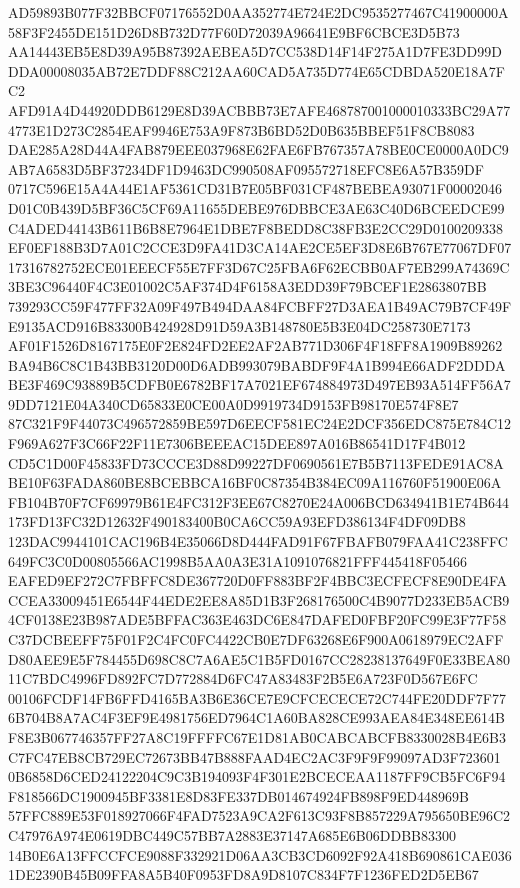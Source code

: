 \documentclass[UTF8,fontset=fandol,zihao=-4,a4paper]{ctexart}
\begin{document}
{{AD59893B077F32BBCF07176552D0AA352774E724E2DC9535277467C41900000A58F3F2455DE151D26D8B732D77F60D72039A96641E9BF6CBCE3D5B73
AA14443EB5E8D39A95B87392AEBEA5D7CC538D14F14F275A1D7FE3DD99DDDA00008035AB72E7DDF88C212AA60CAD5A735D774E65CDBDA520E18A7FC2
AFD91A4D44920DDB6129E8D39ACBBB73E7AFE468787001000010333BC29A774773E1D273C2854EAF9946E753A9F873B6BD52D0B635BBEF51F8CB8083
DAE285A28D44A4FAB879EEE037968E62FAE6FB767357A78BE0CE0000A0DC9AB7A6583D5BF37234DF1D9463DC990508AF095572718EFC8E6A57B359DF
0717C596E15A4A44E1AF5361CD31B7E05BF031CF487BEBEA93071F00002046D01C0B439D5BF36C5CF69A11655DEBE976DBBCE3AE63C40D6BCEEDCE99
C4ADED44143B611B6B8E7964E1DBE7F8BEDD8C38FB3E2CC29D0100209338EF0EF188B3D7A01C2CCE3D9FA41D3CA14AE2CE5EF3D8E6B767E77067DF07
17316782752ECE01EEECF55E7FF3D67C25FBA6F62ECBB0AF7EB299A74369C3BE3C96440F4C3E01002C5AF374D4F6158A3EDD39F79BCEF1E2863807BB
739293CC59F477FF32A09F497B494DAA84FCBFF27D3AEA1B49AC79B7CF49FE9135ACD916B83300B424928D91D59A3B148780E5B3E04DC258730E7173
AF01F1526D8167175E0F2E824FD2EE2AF2AB771D306F4F18FF8A1909B89262BA94B6C8C1B43BB3120D00D6ADB993079BABDF9F4A1B994E66ADF2DDDA
BE3F469C93889B5CDFB0E6782BF17A7021EF674884973D497EB93A514FF56A79DD7121E04A340CD65833E0CE00A0D9919734D9153FB98170E574F8E7
87C321F9F44073C496572859BE597D6EECF581EC24E2DCF356EDC875E784C12F969A627F3C66F22F11E7306BEEEAC15DEE897A016B86541D17F4B012
CD5C1D00F45833FD73CCCE3D88D99227DF0690561E7B5B7113FEDE91AC8ABE10F63FADA860BE8BCEBBCA16BF0C87354B384EC09A116760F51900E06A
FB104B70F7CF69979B61E4FC312F3EE67C8270E24A006BCD634941B1E74B644173FD13FC32D12632F490183400B0CA6CC59A93EFD386134F4DF09DB8
123DAC9944101CAC196B4E35066D8D444FAD91F67FBAFB079FAA41C238FFC649FC3C0D00805566AC1998B5AA0A3E31A1091076821FFF445418F05466
EAFED9EF272C7FBFFC8DE367720D0FF883BF2F4BBC3ECFECF8E90DE4FACCEA33009451E6544F44EDE2EE8A85D1B3F268176500C4B9077D233EB5ACB9
4CF0138E23B987ADE5BFFAC363E463DC6E847DAFED0FBF20FC99E3F77F58C37DCBEEFF75F01F2C4FC0FC4422CB0E7DF63268E6F900A0618979EC2AFF
D80AEE9E5F784455D698C8C7A6AE5C1B5FD0167CC28238137649F0E33BEA8011C7BDC4996FD892FC7D772884D6FC47A83483F2B5E6A723F0D567E6FC
00106FCDF14FB6FFD4165BA3B6E36CE7E9CFCECECE72C744FE20DDF7F776B704B8A7AC4F3EF9E4981756ED7964C1A60BA828CE993AEA84E348EE614B
F8E3B067746357FF27A8C19FFFFC67E1D81AB0CABCABCFB8330028B4E6B3C7FC47EB8CB729EC72673BB47B888FAAD4EC2AC3F9F9F99097AD3F723601
0B6858D6CED24122204C9C3B194093F4F301E2BCECEAA1187FF9CB5FC6F94F818566DC1900945BF3381E8D83FE337DB014674924FB898F9ED448969B
57FFC889E53F018927066F4FAD7523A9CA2F613C93F8B857229A795650BE96C2C47976A974E0619DBC449C57BB7A2883E37147A685E6B06DDBB83300
14B0E6A13FFCCFCE9088F332921D06AA3CB3CD6092F92A418B690861CAE0361DE2390B45B09FFA8A5B40F0953FD8A9D8107C834F7F1236FED2D5EB67
}}
\end{document}
